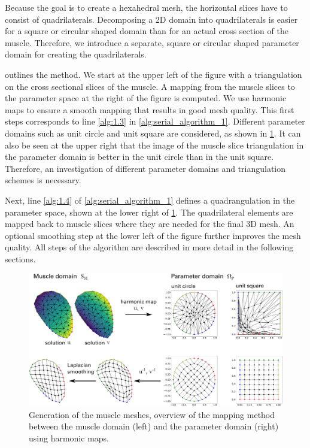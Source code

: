 Because the goal is to create a hexahedral mesh, the horizontal slices have to consist of quadrilaterals. 
Decomposing a 2D domain into quadrilaterals is easier for a square or circular shaped domain than for an actual cross section of the muscle. Therefore, we introduce a separate, square or circular shaped parameter domain for creating the quadrilaterals.

 outlines the method.
We start at the upper left of the figure with a triangulation on the cross sectional slices of the muscle. A mapping from the muscle slices to the parameter space at the right of the figure is computed. We use harmonic maps to ensure a smooth mapping that results in good mesh quality. This first steps corresponds to line \ref{alg:1.3} in \cref{alg:serial_algorithm_1}. Different parameter domains such as unit circle and unit square are considered, as shown in \cref{fig:harmonic_map_solution}. It can also be seen at the upper right that the image of the muscle slice triangulation in the parameter domain is better in the unit circle than in the unit square. Therefore, an investigation of different parameter domains and triangulation schemes is necessary.

Next, line \ref{alg:1.4} of \cref{alg:serial_algorithm_1} defines a quadrangulation in the parameter space, shown at the lower right of \cref{fig:harmonic_map_solution}. The quadrilateral elements are mapped back to muscle slices where they are needed for the final 3D mesh. An optional smoothing step at the lower left of the figure further improves the mesh quality.
All steps of the algorithm are described in more detail in the following sections.

\begin{figure}%
  \centering%
  \includegraphics[width=\textwidth]{images/fiber_creation/harmonic_map_scheme_circle_square.pdf}%
  \caption{Generation of the muscle meshes, overview of the mapping method between the muscle domain (left) and the parameter domain (right) using harmonic maps.}%
  \label{fig:harmonic_map_solution}%
\end{figure}%

